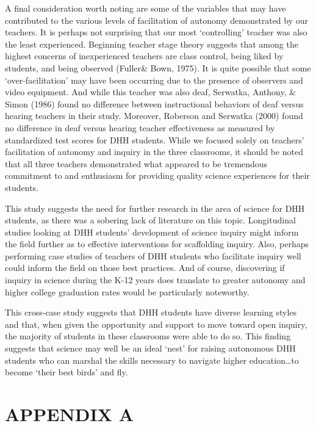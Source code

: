 \documentclass[11.5pt]{sig-alternate} %
\begin{document}
\begin{large}
A final consideration worth noting are some of the variables that may have contributed to the various levels of facilitation of autonomy demonstrated by our teachers.  It is perhaps not surprising that our most ‘controlling’ teacher was also the least experienced. Beginning teacher stage theory suggests that among the highest concerns of inexperienced teachers are class control, being liked by students, and being observed (Fuller\& Bown, 1975).  It is quite possible that some ‘over-facilitation’ may have been occurring due to the presence of observers and video equipment.  And while this teacher was also deaf, Serwatka, Anthony, \& Simon (1986) found no difference between instructional behaviors of deaf versus hearing teachers in their study.  Moreover, Roberson and Serwatka (2000) found no difference in deaf versus hearing teacher effectiveness as measured by standardized test scores for DHH students.  While we focused solely on teachers’ facilitation of autonomy and inquiry in the three classrooms, it should be noted that all three teachers demonstrated what appeared to be tremendous commitment to and enthusiasm for providing quality science experiences for their students. 
 
 This study suggests the need for further research in the area of science for DHH students, as there was a sobering lack of literature on this topic.  Longitudinal studies looking at DHH students’ development of science inquiry might inform the field further as to effective interventions for scaffolding inquiry.  Also, perhaps performing case studies of teachers of DHH students who facilitate inquiry well could inform the field on those best practices.  And of course, discovering if inquiry in science during the K-12 years does translate to greater autonomy and higher college graduation rates would be particularly noteworthy.   

This cross-case study suggests that DHH students have diverse learning styles and that, when given the opportunity and support to move toward open inquiry, the majority of students in these classrooms were able to do so.  This finding suggests that science may well be an ideal ‘nest’ for raising autonomous DHH students who can marshal the skills necessary to navigate higher education…to become ‘their best birds’ and fly. 

\section*{APPENDIX A}


\end{large}
\end{document}
